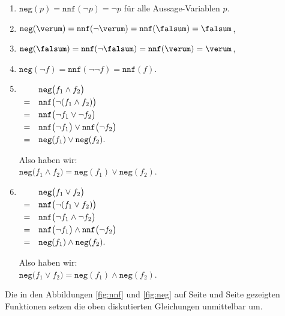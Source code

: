 \begin{enumerate}
\item $\texttt{neg}(p) = \texttt{nnf}(\neg p) = \neg p$ für alle Aussage-Variablen $p$.
\item $\texttt{neg}(\verum) = \texttt{nnf}(\neg\verum) = \texttt{nnf}(\falsum) = \falsum$, 
\item $\texttt{neg}(\falsum) = \texttt{nnf}(\neg\falsum) = \texttt{nnf}(\verum) = \verum$,
\item $\texttt{neg}(\neg f) = \texttt{nnf}(\neg \neg f) = \texttt{nnf}(f)$.
\item $\begin{array}[t]{cl}
         & \texttt{neg}\bigl(f_1 \wedge f_2 \bigr) \\[0.1cm]
       = & \texttt{nnf}\bigl(\neg(f_1 \wedge f_2)\bigr) \\[0.1cm]
       = & \texttt{nnf}\bigl(\neg f_1 \vee \neg f_2\bigr) \\[0.1cm]
       = & \texttt{nnf}\bigl(\neg f_1\bigr) \vee \texttt{nnf}\bigl(\neg f_2\bigr) \\[0.1cm]
       = & \texttt{neg}(f_1) \vee \texttt{neg}(f_2).
       \end{array}
      $

      Also haben wir:
      \\[0.2cm]
      \hspace*{1.3cm}
      $\texttt{neg}\bigl(f_1 \wedge f_2 \bigr) = \texttt{neg}(f_1) \vee \texttt{neg}(f_2)$.
\item $\begin{array}[t]{cl}
         & \texttt{neg}\bigl(f_1 \vee f_2 \bigr)        \\[0.1cm]
       = & \texttt{nnf}\bigl(\neg(f_1 \vee f_2) \bigr)  \\[0.1cm]
       = & \texttt{nnf}\bigl(\neg f_1 \wedge \neg f_2 \bigr)  \\[0.1cm]
       = & \texttt{nnf}\bigl(\neg f_1\bigr) \wedge \texttt{nnf}\bigl(\neg f_2 \bigr)  \\[0.1cm]
       = & \texttt{neg}(f_1) \wedge \texttt{neg}(f_2). 
       \end{array}
      $

      Also haben wir: 
      \\[0.2cm]
      \hspace*{1.3cm}
      $\texttt{neg}\bigl(f_1 \vee f_2 \bigr) = \texttt{neg}(f_1) \wedge \texttt{neg}(f_2)$.
\end{enumerate}
Die in den Abbildungen \ref{fig:nnf} und \ref{fig:neg} auf Seite \pageref{fig:nnf} und Seite \pageref{fig:neg} gezeigten Funktionen setzen die oben diskutierten
Gleichungen unmittelbar um. 



